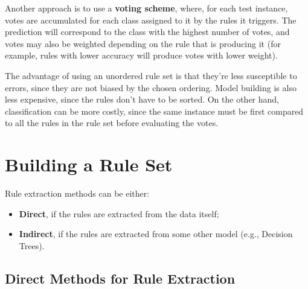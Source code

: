 Another approach is to use a \textbf{voting scheme}, where, for each test instance, votes are accumulated for each class assigned to it by the rules it triggers. The prediction will correspond to the class with the highest number of votes, and votes may also be weighted depending on the rule that is producing it (for example, rules with lower accuracy will produce votes with lower weight).

The advantage of using an unordered rule set is that they're less susceptible to errors, since they are not biased by the chosen ordering. Model building is also less expensive, since the rules don't have to be sorted. On the other hand, classification can be more costly, since the same instance must be first compared to all the rules in the rule set before evaluating the votes.

\section{Building a Rule Set}

Rule extraction methods can be either:
\begin{itemize}
    \item \textbf{Direct}, if the rules are extracted from the data itself;
    \item \textbf{Indirect}, if the rules are extracted from some other model (e.g., Decision Trees).
\end{itemize}

\subsection{Direct Methods for Rule Extraction}


